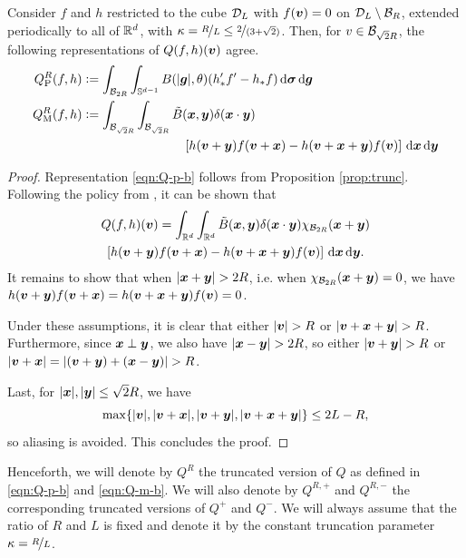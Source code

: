 \begin{proposition} \label{prop:equiv}
Consider $f$ and $h$ restricted to the cube $\mathcal{D}_L$ with $f({\bm v})=0$ on
$\mathcal{D}_L\setminus\mathcal{B}_R$, extended periodically to all of $\mathbb{R}^d$, with
$\kappa=\nicefrac{R}{L}\leq\nicefrac{2}{(3+\sqrt{2})}$. Then, for $v\in\mathcal{B}_{\sqrt{2}R}$, the
following representations of $Q(f,h)({\bm v})$ agree.
\begin{align}
    \label{eqn:Q-p-b}
    Q^R_{\mathrm{P}}(f,h) &\vcentcolon= 
    \int_{\mathcal{B}_{2R}}\int_{\mathbb{S}^{d-1}} B(|{\bm g}|,\theta)(h_*'f'-h_*f)\,\mathrm{d}{\bm\sigma} \,\mathrm{d} {\bm g} \\
    \label{eqn:Q-m-b} 
    Q^R_{\mathrm{M}}(f,h) &\vcentcolon= \int_{\mathcal{B}_{\sqrt{2}R}}\int_{\mathcal{B}_{\sqrt{2}R}} \tilde{B}({\bm x},{\bm y})\delta({\bm x}\cdot {\bm y}) \\
    \nonumber & \qquad\qquad\qquad\qquad
        \left[ h({\bm v}+{\bm y})f({\bm v}+{\bm x}) - h({\bm v}+{\bm x}+{\bm y})f({\bm v}) \right] \,\mathrm{d} {\bm x} \,\mathrm{d} {\bm y}
\end{align}
\end{proposition}
\begin{proof}
Representation \eqref{eqn:Q-p-b} follows from Proposition \ref{prop:trunc}.
Following the policy from \cite{Mouhot06}, it can be shown that 
\begin{multline*}
    Q(f,h)({\bm v}) = \int_{\mathbb{R}^d}\int_{\mathbb{R}^d}\tilde{B}({\bm x},{\bm y})\delta({\bm x}\cdot {\bm y})\chi_{\mathcal{B}_{2R}}({\bm x}+{\bm y})  \\ 
    \left[h({\bm v}+{\bm y})f({\bm v}+{\bm x})-h({\bm v}+{\bm x}+{\bm y})f({\bm v})\right] \,\mathrm{d} {\bm x} \,\mathrm{d} {\bm y}. 
\end{multline*}
It remains to show that when $|\Bx+\By|>2R$, i.e. when
$\chi_{\mathcal{B}_{2R}}({\bm x}+{\bm y})=0$, we have $h({\bm v}+{\bm y})f({\bm v}+{\bm x}) = h({\bm v}+{\bm x}+{\bm y})f({\bm v})
= 0$.

Under these assumptions, it is clear that either $|\Bv|>R$ or
$|\Bv+\Bx+\By|>R$. Furthermore, since ${\bm x}\perp {\bm y}$, we also have
$|\Bx-\By|>2R$, so either $|\Bv+\By|>R$ or $|{\bm v}+{\bm x}| =
|({\bm v}+{\bm y})+({\bm x}-{\bm y})| > R$.

Last, for $|{\bm x}|,|{\bm y}|\leq\sqrt{2}R$, we have
\[
    \max\{|{\bm v}|,|{\bm v}+{\bm x}|,|{\bm v}+{\bm y}|,|{\bm v}+{\bm x}+{\bm y}|\} \leq 2L-R,
\]
so aliasing is avoided. This concludes the proof.
\end{proof}

Henceforth, we will denote by $Q^R$ the truncated version of $Q$ as defined in \eqref{eqn:Q-p-b} and
\eqref{eqn:Q-m-b}. We will also denote by $Q^{R,+}$ and $Q^{R,-}$ the corresponding truncated versions of
$Q^+$ and $Q^-$. We will always assume that the ratio of $R$ and $L$ is fixed and denote it by the constant
truncation parameter $\kappa=\nicefrac{R}{L}$.

